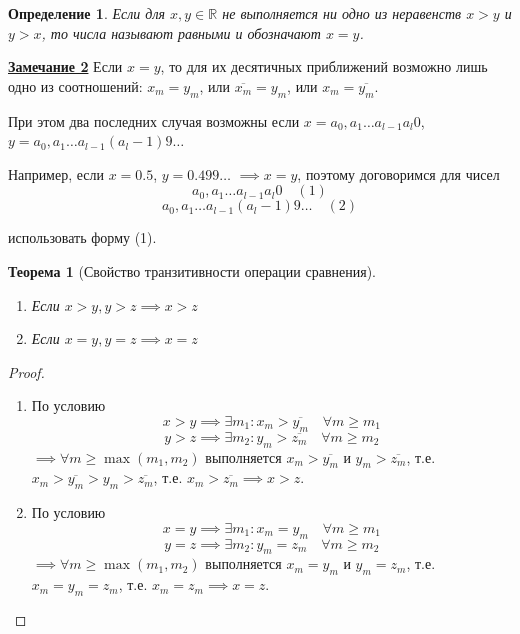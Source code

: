 \documentclass[a4paper,oneside]{article}
\newcommand{\parspace}{\vspace{10pt}}
\newtheorem{theorem}{Теорема}[subsection]
\newtheorem{definition}{Определение}[subsection]
\begin{document}
\begin{definition}
    Если для $x, y \in \mathbb{R}$ не выполняется ни одно из неравенств $x > y$ и $y > x$,
    то числа называют равными и обозначают $x = y$.
\end{definition}

\underline{\textbf{Замечание 2}}
Если $x = y$, то для их десятичных приближений возможно лишь одно из соотношений:
$x_m = y_m$, или $\overline{x_m} = y_m$, или $x_m = \overline{y_m}$.

При этом два последних случая возможны если $x = a_0,a_1 \dots a_{l-1}a_l0$,
$y = a_0,a_1 \dots a_{l-1}(a_l-1)9 \dots$ 

Например, если $x = 0.5$, $y = 0.499 \dots$ $\implies x = y$,
поэтому договоримся для чисел
\[a_0,a_1 \dots a_{l-1}a_l0 \quad (1)\]
\[a_0,a_1 \dots a_{l-1}(a_l-1)9 \dots \quad (2)\]

использовать форму (1).

\parspace

\begin{theorem}[Свойство транзитивности операции сравнения]
    \begin{enumerate}[label=\alph*)]
        \item Если $x > y, y > z \implies x > z$
        \item Если $x = y, y = z \implies x = z$
    \end{enumerate}
\end{theorem}

\begin{proof}
    \begin{enumerate}[label=\alph*)]
        \item
            По условию
            \[x > y \implies \exists m_1: x_m > \overline{y_m} \quad \forall m \ge m_1\]
            \[y > z \implies \exists m_2: y_m > \overline{z_m} \quad \forall m \ge m_2\]
            $\implies \forall m \ge \max (m_1, m_2)$ выполняется $x_m > \overline{y_m}$
            и $y_m > \overline{z_m}$, т.е. $x_m > \overline{y_m} > y_m > \overline{z_m}$,
            т.е. $x_m > \overline{z_m} \implies x > z$.
        
        \item
            По условию
            \[x = y \implies \exists m_1: x_m = y_m \quad \forall m \ge m_1\]
            \[y = z \implies \exists m_2: y_m = z_m \quad \forall m \ge m_2\]
            $\implies \forall m \ge \max (m_1, m_2)$ выполняется $x_m = y_m$
            и $y_m = z_m$, т.е. $x_m = y_m = z_m$,
            т.е. $x_m = z_m \implies x = z$.
    \end{enumerate}
\end{proof}
\end{document}
